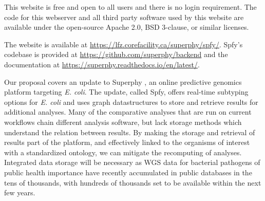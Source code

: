


This website is free and open to all users and there is no login requirement. The code for this webserver and all third party software used by this website are available under the open-source Apache 2.0, BSD 3-clause, or similar licenses.

The website is available at \url{https://lfz.corefacility.ca/superphy/spfy/}. Spfy's codebase is provided at \url{https://github.com/superphy/backend} and the documentation at \url{https://superphy.readthedocs.io/en/latest/}.

Our proposal covers an update to Superphy \citep{whiteside2016superphy}, an online predictive genomics platform targeting \textit{E. coli}.
The update, called Spfy, offers real-time subtyping options for \textit{E. coli} and uses graph datastructures to store and retrieve results for additional analyses.
Many of the comparative analyses that are run on current workflows chain different analysis software, but lack storage methods which understand the relation between results.
By making the storage and retrieval of results part of the platform, and effectively linked to the organisms of interest with a standardized ontology, we can mitigate the recomputing of analyses.
Integrated data storage will be necessary as WGS data for bacterial pathogens of public health importance have recently accumulated in public databases in the tens of thousands, with hundreds of thousands set to be available within the next few years.

